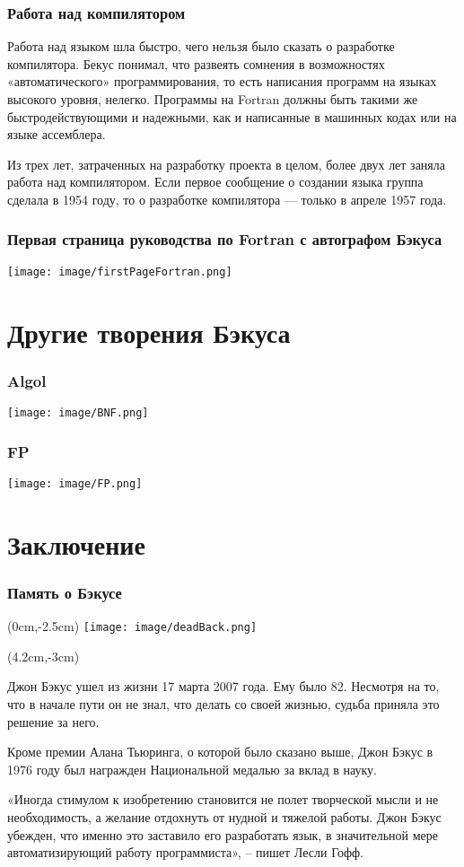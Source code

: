 \documentclass{beamer}
\begin{document}
\begin{frame}
\frametitle{Работа над компилятором}
Работа над языком шла быстро, чего нельзя было сказать о разработке компилятора. Бекус понимал, что развеять сомнения в возможностях «автоматического» программирования, то есть написания программ на языках высокого уровня, нелегко. Программы на Fortran должны быть такими же быстродействующими и надежными, как и написанные в машинных кодах или на языке ассемблера.

Из трех лет, затраченных на разработку проекта в целом, более двух лет заняла работа над компилятором. Если первое сообщение о создании языка группа сделала в 1954 году, то о разработке компилятора — только в апреле 1957 года.
\end{frame}

\begin{frame}
\frametitle{Первая страница руководства по Fortran с автографом Бэкуса}
\centering
\texttt{[image: image/firstPageFortran.png]}

\end{frame}

\section{Другие творения Бэкуса}
\begin{frame}
\frametitle{Algol}
\centering
\texttt{[image: image/BNF.png]}
\end{frame}

\begin{frame}
\frametitle{FP}

\centering
\texttt{[image: image/FP.png]}
\end{frame}

\section{Заключение}
\begin{frame}
\frametitle{Память о Бэкусе}

\begin{textblock*}{4cm}(0cm,-2.5cm)
\centering
\texttt{[image: image/deadBack.png]}
\end{textblock*}

\begin{textblock*}{8cm}(4.2cm,-3cm)

Джон Бэкус ушел из жизни 17 марта 2007 года. Ему было 82. Несмотря на то, что в начале пути он не знал, что делать со своей жизнью, судьба приняла это решение за него.

Кроме премии Алана Тьюринга, о которой было сказано выше, Джон Бэкус в 1976 году был награжден Национальной медалью за вклад в науку.

«Иногда стимулом к изобретению становится не полет творческой мысли и не необходимость, а желание отдохнуть от нудной и тяжелой работы. Джон Бэкус убежден, что именно это заставило его разработать язык, в значительной мере автоматизирующий работу программиста», – пишет Лесли Гофф.
\end{textblock*}
\end{frame}
\end{document}
